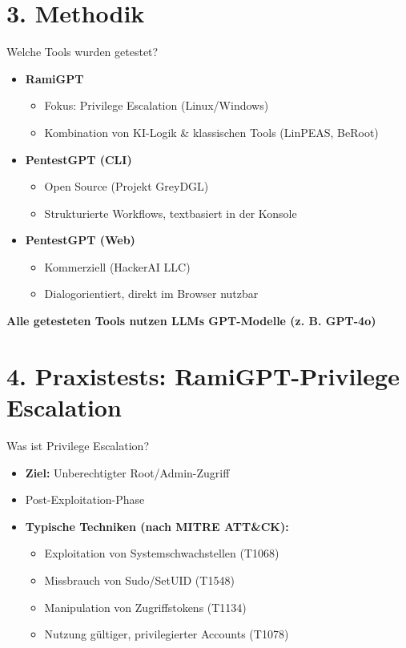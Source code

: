 \documentclass[
	aspectratio=169,	%
	onlytextwidth,		%
	t,					%
	]{beamer}
\begin{document}
\section{3. Methodik}

\begin{frame}{Welche Tools wurden getestet?}
	
	\begin{itemize}
		\item \textbf{RamiGPT}
		\begin{itemize}
			\item Fokus: Privilege Escalation (Linux/Windows)
			\item Kombination von KI-Logik \& klassischen Tools (LinPEAS, BeRoot)
		\end{itemize}
		
		\item \textbf{PentestGPT (CLI)}
		\begin{itemize}
			\item Open Source (Projekt GreyDGL)
			\item Strukturierte Workflows, textbasiert in der Konsole
		\end{itemize}
		
		\item \textbf{PentestGPT (Web)}
		\begin{itemize}
			\item Kommerziell (HackerAI LLC)
			\item Dialogorientiert, direkt im Browser nutzbar
		\end{itemize}
	\end{itemize}
	\hspace{0.1em} \textbf{Alle getesteten Tools nutzen LLMs GPT-Modelle (z. B. GPT-4o)}
	
\end{frame}



\section{4. Praxistests: RamiGPT-Privilege Escalation}
\begin{frame}{Was ist Privilege Escalation?}
	\begin{itemize}
		\item \textbf{Ziel:} Unberechtigter Root/Admin-Zugriff
		\item Post-Exploitation-Phase
		\vspace{2mm}
		\item \textbf{Typische Techniken (nach MITRE ATT\&CK):}
		\begin{itemize}
			\item Exploitation von Systemschwachstellen (T1068)
			\item Missbrauch von Sudo/SetUID (T1548)
			\item Manipulation von Zugriffstokens (T1134)
			\item Nutzung gültiger, privilegierter Accounts (T1078)
		\end{itemize}
	\end{itemize}
\end{frame}
\end{document}
